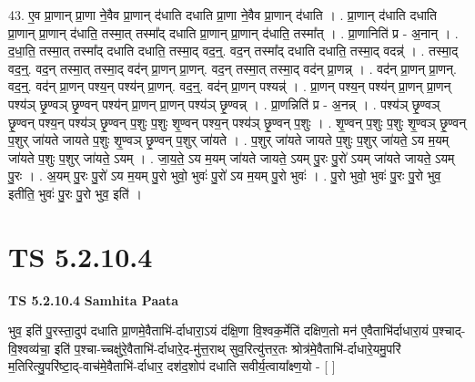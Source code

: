 \documentclass[17pt]{extarticle}
\begin{document}
43. ए॒व प्रा॒णान् प्रा॒णा ने॒वैव प्रा॒णान् द॑धाति दधाति प्रा॒णा ने॒वैव प्रा॒णान् द॑धाति । . प्रा॒णान् द॑धाति दधाति प्रा॒णान् प्रा॒णान् द॑धाति॒ तस्मा॒त् तस्मा᳚द् दधाति प्रा॒णान् प्रा॒णान् द॑धाति॒ तस्मा᳚त् । . प्रा॒णानिति॑ प्र - अ॒नान् । . द॒धा॒ति॒ तस्मा॒त् तस्मा᳚द् दधाति दधाति॒ तस्मा॒द् वद॒न्॒. वद॒न् तस्मा᳚द् दधाति दधाति॒ तस्मा॒द् वदन्न्॑ । . तस्मा॒द् वद॒न्॒. वद॒न् तस्मा॒त् तस्मा॒द् वद॑न् प्रा॒णन् प्रा॒णन्. वद॒न् तस्मा॒त् तस्मा॒द् वद॑न् प्रा॒णन्न् । . वद॑न् प्रा॒णन् प्रा॒णन्. वद॒न्॒. वद॑न् प्रा॒णन् पश्य॒न् पश्य॑न् प्रा॒णन्. वद॒न्॒. वद॑न् प्रा॒णन् पश्यन्न्॑ । . प्रा॒णन् पश्य॒न् पश्य॑न् प्रा॒णन् प्रा॒णन् पश्य॑ञ् छृ॒ण्वञ् छृ॒ण्वन् पश्य॑न् प्रा॒णन् प्रा॒णन् पश्य॑ञ् छृ॒ण्वन्न् । . प्रा॒णन्निति॑ प्र - अ॒नन्न् । . पश्य॑ञ् छृ॒ण्वञ् छृ॒ण्वन् पश्य॒न् पश्य॑ञ् छृ॒ण्वन् प॒शुः प॒शुः शृ॒ण्वन् पश्य॒न् पश्य॑ञ् छृ॒ण्वन् प॒शुः । . शृ॒ण्वन् प॒शुः प॒शुः शृ॒ण्वञ् छृ॒ण्वन् प॒शुर् जा॑यते जायते प॒शुः शृ॒ण्वञ् छृ॒ण्वन् प॒शुर् जा॑यते । . प॒शुर् जा॑यते जायते प॒शुः प॒शुर् जा॑यते॒ ऽय म॒यम् जा॑यते प॒शुः प॒शुर् जा॑यते॒ ऽयम् । . जा॒य॒ते॒ ऽय म॒यम् जा॑यते जायते॒ ऽयम् पु॒रः पु॒रो॑ ऽयम् जा॑यते जायते॒ ऽयम् पु॒रः । . अ॒यम् पु॒रः पु॒रो॑ ऽय म॒यम् पु॒रो भुवो॒ भुवः॑ पु॒रो॑ ऽय म॒यम् पु॒रो भुवः॑ । . पु॒रो भुवो॒ भुवः॑ पु॒रः पु॒रो भुव॒ इतीति॒ भुवः॑ पु॒रः पु॒रो भुव॒ इति॑ । \newline
\pagebreak
{}

\section{ TS 5.2.10.4 }

\textbf{TS 5.2.10.4 } \newline
\textbf{Samhita Paata} \newline

भुव॒ इति॑ पु॒रस्ता॒दुप॑ दधाति प्रा॒णमे॒वैताभि॑-र्दाधारा॒ऽयं द॑क्षि॒णा वि॒श्वक॒र्मेति॑ दक्षिण॒तो मन॑ ए॒वैताभि॑र्दाधारा॒यं प॒श्चाद्-वि॒श्वव्य॑चा॒ इति॑ प॒श्चा-च्चक्षु॑रे॒वैताभि॑-र्दाधारे॒द-मु॑त्त॒राथ् सुव॒रित्यु॑त्तर॒तः श्रोत्र॑मे॒वैताभि॑-र्दाधारे॒यमु॒परि॑ म॒तिरित्यु॒परि॑ष्टा॒द्-वाच॑मे॒वैताभि॑-र्दाधार॒ दश॑द॒शोप॑ दधाति सवीर्य॒त्वाया᳚क्ष्ण॒यो - [  ] \newline
\end{document}
